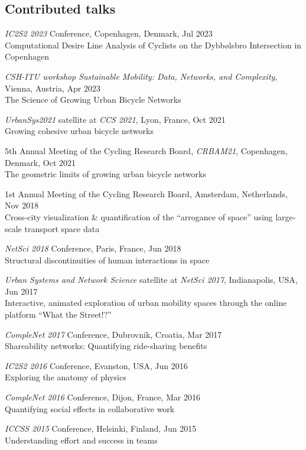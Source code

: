 \documentclass[10pt,a4paper]{article}
\renewenvironment{itemize}{
  \begin{list}{}{
    \setlength{\leftmargin}{1.5em}
    \setlength{\itemsep}{0.25em}
    \setlength{\parskip}{0pt}
    \setlength{\parsep}{0.25em}
  }
}{
  \end{list}
}
\begin{document}
\subsection*{Contributed talks}
\begin{itemize}
\item{\emph{IC2S2 2023} Conference, Copenhagen, Denmark, Jul 2023\\Computational Desire Line Analysis of Cyclists on the Dybbølsbro Intersection in Copenhagen}
\item{\emph{CSH-ITU workshop Sustainable Mobility: Data, Networks, and Complexity}, Vienna, Austria, Apr 2023\\The Science of Growing Urban Bicycle Networks}
\item{\emph{UrbanSys2021} satellite at \emph{CCS 2021}, Lyon, France, Oct 2021\\Growing cohesive urban bicycle networks}
\item{5th Annual Meeting of the Cycling Research Board, \emph{CRBAM21}, Copenhagen, Denmark, Oct 2021\\The geometric limits of growing urban bicycle networks}
\item{1st Annual Meeting of the Cycling Research Board, Amsterdam, Netherlands, Nov 2018\\Cross-city visualization \& quantification of the ``arrogance of space'' using large-scale transport space data}
\item{\emph{NetSci 2018} Conference, Paris, France, Jun 2018\\Structural discontinuities of human interactions in space}
\item{\emph{Urban Systems and Network Science} satellite at \emph{NetSci 2017}, Indianapolis, USA, Jun 2017\\Interactive, animated exploration of urban mobility spaces through the online platform ``What the Street!?''}
\item{\emph{CompleNet 2017} Conference, Dubrovnik, Croatia, Mar 2017\\Shareability networks: Quantifying ride-sharing benefits}
\item{\emph{IC2S2 2016} Conference, Evanston, USA, Jun 2016\\Exploring the anatomy of physics}
\item{\emph{CompleNet 2016} Conference, Dijon, France, Mar 2016\\Quantifying social effects in collaborative work}
\item{\emph{ICCSS 2015} Conference, Helsinki, Finland, Jun 2015\\Understanding effort and success in teams}

\end{itemize}
\end{document}

